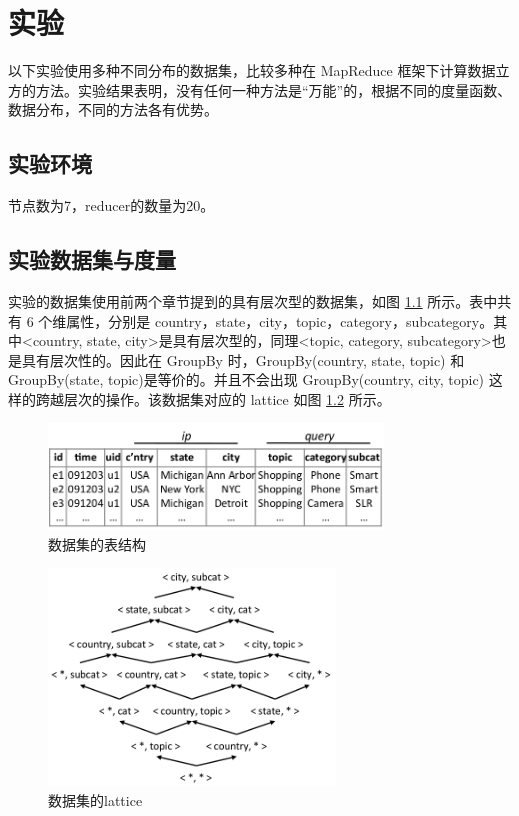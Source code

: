 \chapter{实验}

以下实验使用多种不同分布的数据集，比较多种在 MapReduce 框架下计算数据立方的方法。实验结果表明，没有任何一种方法是``万能”的，根据不同的度量函数、数据分布，不同的方法各有优势。

\section{实验环境}

节点数为7，reducer的数量为20。

\section{实验数据集与度量}

实验的数据集使用前两个章节提到的具有层次型的数据集，如图 \ref{dataset_table} 所示。表中共有 6 个维属性，分别是 country，state，city，topic，category，subcategory。其中\textless country, state, city\textgreater 是具有层次型的，同理\textless topic, category, subcategory\textgreater 也是具有层次性的。因此在 GroupBy 时，GroupBy(country, state, topic) 和 GroupBy(state, topic)是等价的。并且不会出现 GroupBy(country, city, topic) 这样的跨越层次的操作。该数据集对应的 lattice 如图 \ref{dataset_lattice} 所示。

\begin{figure}[!htb]
\centering\includegraphics[width=3.5in]{picture/ch_datacube_mr/dataset_table} 
\caption{数据集的表结构}\label{dataset_table} 
\end{figure} 

\begin{figure}[!htb]
\centering\includegraphics[width=3in]{picture/ch_datacube_mr/dataset_lattice} 
\caption{数据集的lattice}\label{dataset_lattice} 
\end{figure} 

